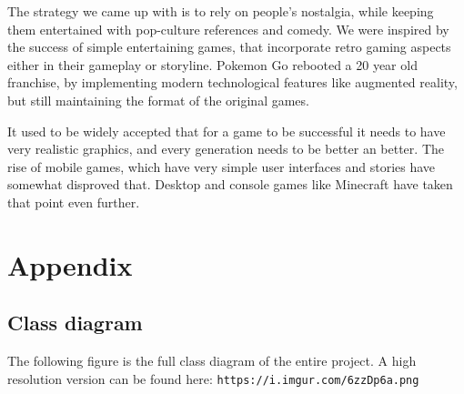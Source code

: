 \documentclass[12p]{article}
\begin{document}
The strategy we came up with is to rely on people's nostalgia, while keeping them entertained with pop-culture references and comedy. We were inspired by the success of simple entertaining games, that incorporate retro gaming aspects either in their gameplay or storyline. Pokemon Go \cite{PokemonGO} rebooted a 20 year old franchise, by implementing modern technological features like augmented reality, but still maintaining the format of the original games.

It used to be widely accepted that for a game to be successful it needs to have very realistic graphics, and every generation needs to be better an better. The rise of mobile games, which have very simple user interfaces and stories have somewhat disproved that. Desktop and console games like Minecraft \cite{Minecraft} have taken that point even further.


\newpage
\printbibliography[heading=bibintoc,title={References}]


\newpage
\appendix

\section{Appendix}

\subsection{Class diagram} \label{AppendixClassDiagramFull}

The following figure is the full class diagram of the entire project. A high resolution version can be found here: \texttt{https://i.imgur.com/6zzDp6a.png}
\end{document}
